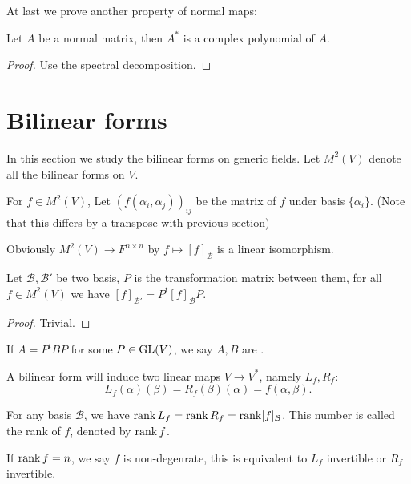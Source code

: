 At last we prove another property of normal maps:
\begin{proposition}
	Let $A$ be a normal matrix, then $A^*$ is a complex polynomial of $A$.
\end{proposition}
\begin{proof}[Proof]
    Use the spectral decomposition.
\end{proof}

\section{Bilinear forms}
\label{sec:Bilinear forms}
In this section we study the bilinear forms on generic fields.
Let $M^2(V)$ denote all the bilinear forms on $V$.

For $f\in M^2(V)$,
Let $(f(\alpha_i, \alpha_j))_{ij}$ be the matrix of $f$ under basis $\{\alpha_i\}$.
(Note that this differs by a transpose with previous section)

Obviously $M^2(V) \to F^{n\times n}$ by $f\mapsto [f]_{\mathcal{B}}$ is
a linear isomorphism.

\begin{proposition}
	Let $ \mathcal{B}, \mathcal{B}'$ be two basis,
	$P$ is the transformation matrix between them, for all $f\in M^2(V)$ we
	have $[f]_{\mathcal{B}'} = P^t[f]_{\mathcal{B}}P$.
\end{proposition}
\begin{proof}[Proof]
    Trivial.
\end{proof}

If $A = P^tBP$ for some $P\in \mathrm{GL}(V)$, we say $A, B$ are .

A bilinear form will induce two linear maps $V\to V^*$, namely $L_f, R_f$:
\[
L_f(\alpha)(\beta) = R_f(\beta)(\alpha) = f(\alpha, \beta).
\]
\begin{proposition}
	For any basis $ \mathcal{B}$,
	we have $\operatorname{rank} L_f = \operatorname{rank} R_f = \operatorname{rank} [f]_{\mathcal{B}}$.
	This number is called the rank of $f$, denoted by $\operatorname{rank} f$.
\end{proposition}

If $\operatorname{rank} f = n$, we say $f$ is non-degenrate, this is equivalent to
$L_f$ invertible or $R_f$ invertible.

